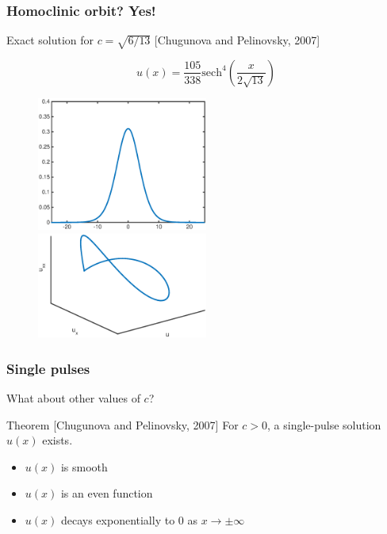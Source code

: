 \documentclass[16pt]{beamer}
\begin{document}
\begin{frame}
	\frametitle{Homoclinic orbit? Yes!}
	\fontsize{16}{7.2}\selectfont
	Exact solution for $c = \sqrt{6/13}$ \footnotesize [Chugunova and Pelinovsky, 2007]
	\begin{center}
	\[
	u(x) = \frac{105}{338}\text{sech}^4\left( \frac{x}{2\sqrt{13}}\right) 
	\]
	\end{center}
	\begin{figure}
   		\includegraphics[width=0.5\textwidth]{images/exactsol}
   		\hfill
   		\includegraphics[width=0.5\textwidth]{images/exactsolorbit}
	\end{figure}
\end{frame}

\begin{frame}
	\frametitle{Single pulses}
	\fontsize{16}{7.2}\selectfont
	What about other values of $c$?

	\vspace{1cm}

	\begin{block}{Theorem \footnotesize [Chugunova and Pelinovsky, 2007]}
	For $c>0$, a single-pulse solution $u(x)$ exists.
	\begin{itemize}
		\item $u(x)$ is smooth
		\item $u(x)$ is an even function
		\item $u(x)$ decays exponentially to 0 as $x \rightarrow \pm \infty$
	\end{itemize}
	\end{block}
\end{frame}
\end{document}

